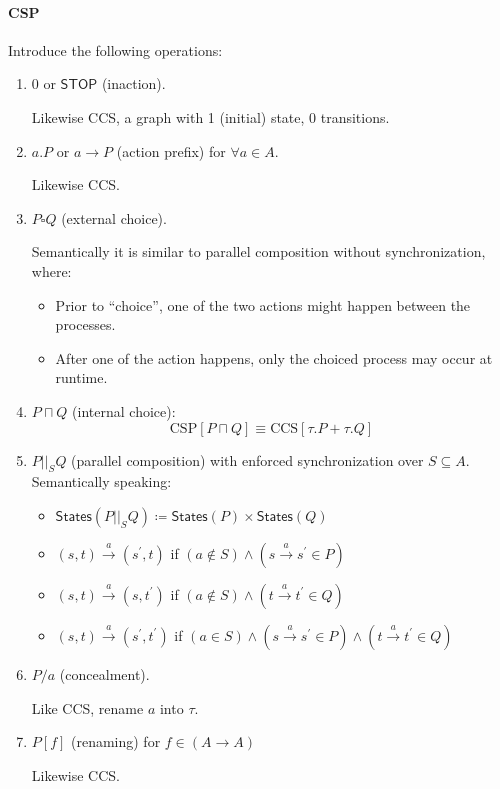 \documentclass[99-notes-packed.tex]{subfiles}
\begin{document}
\paragraph*{CSP}
Introduce the following operations: 
\begin{enumerate}
    \item {
        $0$ or $\mathsf{STOP}$ (inaction).

        Likewise CCS, a graph with 1 (initial) state, 0 transitions. 
    }
    \item {
        $a.P$ or $a \rightarrow P$ (action prefix) for $\forall a \in A$. 

        Likewise CCS.
    }
    \item {
        $P \square Q$ (external choice). 

        Semantically it is similar to parallel composition without synchronization, where: 
        \begin{itemize}
            \item {
                Prior to ``choice'', one of the two actions might happen between the processes.
            }
            \item {
                After one of the action happens, only the choiced process may occur at runtime. 
            }
        \end{itemize}
    }
    \item {
        $P \sqcap Q$ (internal choice):
        \begin{equation*}
            \mathrm{CSP}[P \sqcap Q] \equiv \mathrm{CCS}[\tau.P + \tau.Q]
        \end{equation*}
    }
    \item {
        $P {||}_{S} Q$ (parallel composition) with enforced synchronization over $S \subseteq A$. Semantically speaking: 
        \begin{itemize}
            \item $
                \mathsf{States}(P {||}_{S} Q) \coloneqq
                \mathsf{States}(P) \times \mathsf{States}(Q)
            $
            \item {
                $(s, t) \xrightarrow{a} (s^{'}, t)$ if 
                $(a \notin S) \wedge (s \xrightarrow{a} s^{'} \in P)$
            }
            \item {
                $(s, t) \xrightarrow{a} (s, t^{'})$ if 
                $(a \notin S) \wedge (t \xrightarrow{a} t^{'} \in Q)$
            }
            \item {
                $(s, t) \xrightarrow{a} (s^{'}, t^{'})$ if 
                $(a \in S) \wedge (s \xrightarrow{a} s^{'} \in P) \wedge (t \xrightarrow{a} t^{'} \in Q)$
            }
        \end{itemize}
    }
    \item {
        $P/a$ (concealment).

        Like CCS, rename $a$ into $\tau$. 
    }
    \item {
        $P[f]$ (renaming) for $f \in (A \rightarrow A)$

        Likewise CCS.
    }
\end{enumerate}
\end{document}
